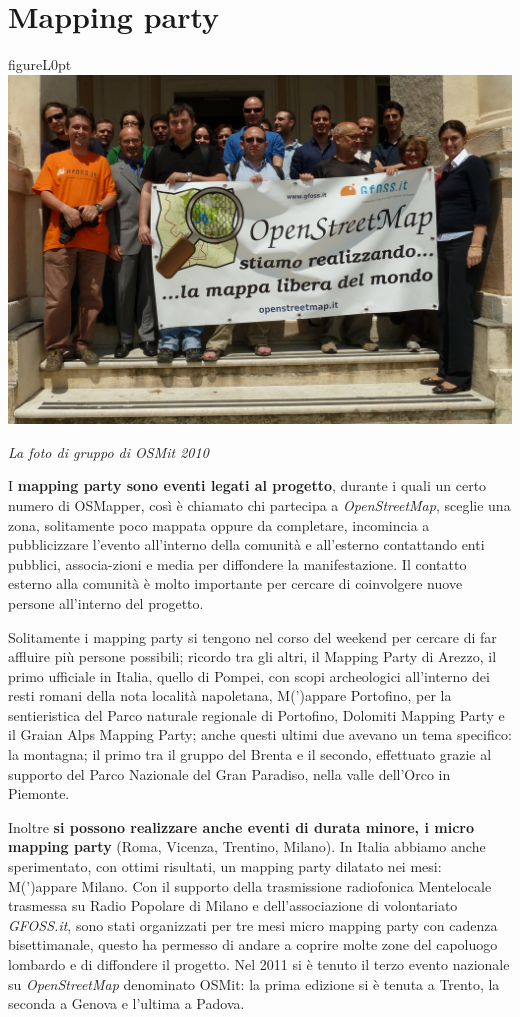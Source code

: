 \documentclass[a4paper,twoside,12pt,]{article}
\newcommand{\osm}{\emph{OpenStreetMap}\xspace}
\newcommand{\pro}[1]{\emph{#1}}
\begin{document}
\section{Mapping party}
\begin{wrapfloat}{figure}{L}{0pt}
 \includegraphics[width=0.55\columnwidth]{Osmit2010.JPG}
 \caption{\small{\textit{La foto di gruppo di OSMit 2010}}}
\end{wrapfloat}
I \textbf{mapping party sono eventi legati al progetto}, durante i quali un certo numero di OSMapper, così è chiamato chi partecipa a \osm, sceglie una zona, solitamente poco mappata oppure da completare, incomincia a pubblicizzare l'evento all'interno della comunità e all'esterno contattando enti pubblici, associa-zioni e media per diffondere la manifestazione. Il contatto esterno alla comunità è molto importante per cercare di coinvolgere nuove persone all'interno del progetto.

Solitamente i mapping party si tengono nel corso del weekend per cercare di far affluire più persone possibili; ricordo tra gli altri, il Mapping Party di Arezzo, il primo ufficiale in Italia, quello di Pompei, con scopi archeologici all'interno dei resti romani della nota località napoletana, M(')appare Portofino, per la sentieristica del Parco naturale regionale di Portofino, Dolomiti Mapping Party e il Graian Alps Mapping Party; anche questi ultimi due avevano un tema specifico: la montagna; il primo tra il gruppo del Brenta e il secondo, effettuato grazie al supporto del Parco Nazionale del Gran Paradiso, nella valle dell'Orco in Piemonte.

Inoltre \textbf{si possono realizzare anche eventi di durata minore, i micro mapping party} (Roma, Vicenza, Trentino, Milano). In Italia abbiamo anche sperimentato, con ottimi risultati, un mapping party dilatato nei mesi: M(')appare Milano. Con il supporto della trasmissione radiofonica Mentelocale trasmessa su Radio Popolare di Milano e dell'associazione di volontariato \pro{GFOSS.it}, sono stati organizzati per tre mesi micro mapping party con cadenza bisettimanale, questo ha permesso di andare a coprire molte zone del capoluogo lombardo e di diffondere il progetto. Nel 2011 si è tenuto il terzo evento nazionale su \osm denominato OSMit: la prima edizione si è tenuta a Trento, la seconda a Genova e l'ultima a Padova.
\end{document}
